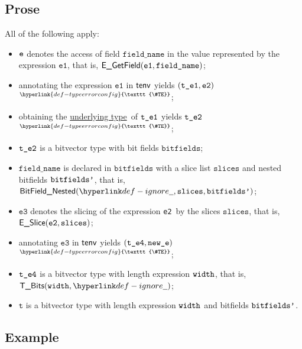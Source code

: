 \documentclass{book}
\newcommand\TypeErrorConfig[0]{\hyperlink{def-typeerrorconfig}{\texttt{\#TE}}}
\newcommand\ProseOrTypeError[0]{\hyperlink{def-proseortypeerror}{$^{\TypeErrorConfig}$}}
\newcommand\underlyingtype[0]{\hyperlink{def-underlyingtype}{underlying type}}
\newcommand\vt[0]{\texttt{t}}
\newcommand\veone[0]{\texttt{e1}}
\newcommand\vetwo[0]{\texttt{e2}}
\newcommand\vethree[0]{\texttt{e3}}
\newcommand\bitfields[0]{\texttt{bitfields}}
\newcommand\fieldname[0]{\texttt{field\_name}}
\newcommand\slices[0]{\texttt{slices}}
\newcommand\newe[0]{\texttt{new\_e}}
\begin{document}
\subsection{Prose}
All of the following apply:
\begin{itemize}
  \item $\texttt{e}$ denotes the access of field $\fieldname$ in the value represented by the expression $\veone$, that is, $\EGetField(\veone, \fieldname)$;
  \item annotating the expression $\veone$ in $\textsf{tenv}$ yields $(\vteone, \vetwo)$ \ProseOrTypeError;
  \item obtaining the \underlyingtype\ of $\texttt{t\_e1}$ yields $\texttt{t\_e2}$ \ProseOrTypeError;
  \item $\texttt{t\_e2}$ is a bitvector type with bit fields $\bitfields$;
  \item $\fieldname$ is declared in $\bitfields$ with a slice list $\slices$ and nested bitfields $\texttt{bitfields'}$, that is,
        $\BitFieldNested(\Ignore, \slices, \bitfieldsp)$;
  \item $\vethree$ denotes the slicing of the expression \vetwo\ by the slices $\slices$, that is, \\ $\ESlice(\vetwo, \slices)$;
  \item annotating $\vethree$ in $\textsf{tenv}$ yields $(\vtefour, \newe)$ \ProseOrTypeError;
  \item $\texttt{t\_e4}$ is a bitvector type with length expression $\texttt{width}$, that is, $\TBits(\width, \Ignore)$;
  \item $\vt$ is a bitvector type with length expression $\texttt{width}$ and bitfields $\texttt{bitfields'}$.
\end{itemize}

\subsection{Example}

\end{document}
